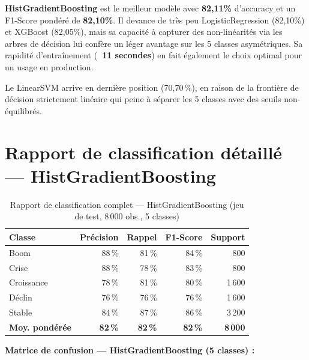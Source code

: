 \documentclass[12pt,a4paper,oneside]{report}
\newcommand{\pct}[1]{#1\,\%}
\begin{document}
\begin{resultbox}
\textbf{HistGradientBoosting} est le meilleur modèle avec \textbf{82,11\%} d'accuracy et un F1-Score pondéré de \textbf{82,10\%}. Il devance de très peu LogisticRegression (82,10\%) et XGBoost (82,05\%), mais sa capacité à capturer des non-linéarités via les arbres de décision lui confère un léger avantage sur les 5 classes asymétriques. Sa rapidité d'entraînement (\textbf{~11 secondes}) en fait également le choix optimal pour un usage en production.

Le LinearSVM arrive en dernière position (\pct{70,70}), en raison de la frontière de décision strictement linéaire qui peine à séparer les 5 classes avec des seuils non-équilibrés.
\end{resultbox}

\section{Rapport de classification détaillé — HistGradientBoosting}

\begin{table}[H]
  \centering
  \caption{Rapport de classification complet — HistGradientBoosting (jeu de test, 8\,000 obs., 5 classes)}
  \label{tab:classif_histgb}
  \begin{tabular}{lrrrr}
    \toprule
    \textbf{Classe} & \textbf{Précision} & \textbf{Rappel} & \textbf{F1-Score} & \textbf{Support} \\
    \midrule
    Boom       & \pct{88} & \pct{81} & \pct{84} & 800 \\
    Crise      & \pct{88} & \pct{78} & \pct{83} & 800 \\
    Croissance & \pct{78} & \pct{81} & \pct{80} & 1\,600 \\
    Déclin     & \pct{76} & \pct{76} & \pct{76} & 1\,600 \\
    Stable     & \pct{84} & \pct{87} & \pct{86} & 3\,200 \\
    \midrule
    \textbf{Moy. pondérée} & \textbf{\pct{82}} & \textbf{\pct{82}} & \textbf{\pct{82}} & \textbf{8\,000} \\
    \bottomrule
  \end{tabular}
\end{table}

\textbf{Matrice de confusion — HistGradientBoosting (5 classes) :}
\end{document}
